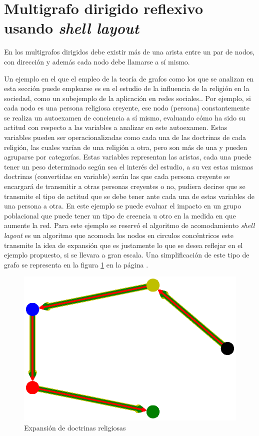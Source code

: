 \documentclass{article}
\begin{document}
\section{Multigrafo dirigido reflexivo usando \textit{shell layout} } 

En los multigrafos dirigidos debe existir más de una arista entre un par de nodos, con dirección y además cada nodo debe llamarse a sí mismo.

Un ejemplo en el que el empleo de la teoría de grafos como los que se analizan en esta sección puede emplearse es en el estudio de la influencia de la religión en la sociedad, como un subejemplo de la aplicación en redes sociales.\cite{redes}. 
Por ejemplo, si cada nodo es una persona religiosa creyente, ese nodo (persona) constantemente se realiza un autoexamen de conciencia a sí mismo, evaluando cómo ha sido su actitud con respecto a las variables a analizar en este autoexamen. Estas variables pueden ser operacionalizadas como cada una de las doctrinas de cada religión, las cuales varían de una religión a otra, pero son más de una y pueden agruparse por categorías. Estas variables representan las aristas, cada una puede tener un peso determinado según sea el interés del estudio, a su vez estas mismas doctrinas (convertidas en variable) serán las que cada persona creyente se encargará de transmitir a otras personas creyentes o no, pudiera decirse que se transmite el tipo de actitud que se debe tener ante cada una de estas variables de una persona a otra. En este ejemplo se puede evaluar el impacto en un grupo poblacional que puede tener un tipo de creencia u otro en la medida en que aumente la red. Para este ejemplo se reservó el algoritmo de acomodamiento \textit{shell layout} es un algoritmo que acomoda los nodos en circulos concéntricos \cite{layout} este transmite la idea de expansión que es justamente lo que se desea reflejar en el ejemplo propuesto, si se llevara a gran escala. Una simplificación de este tipo de grafo se representa en la figura \ref{fig:Fig12} en la página \pageref{fig:Fig12}.
\newpage


\begin{figure}[h]
    \centering
    \includegraphics[scale=0.6]{imagenes1/Fig12.eps}
    \caption{Expansión de doctrinas religiosas}
    \label{fig:Fig12}
\end{figure}




\end{document}

